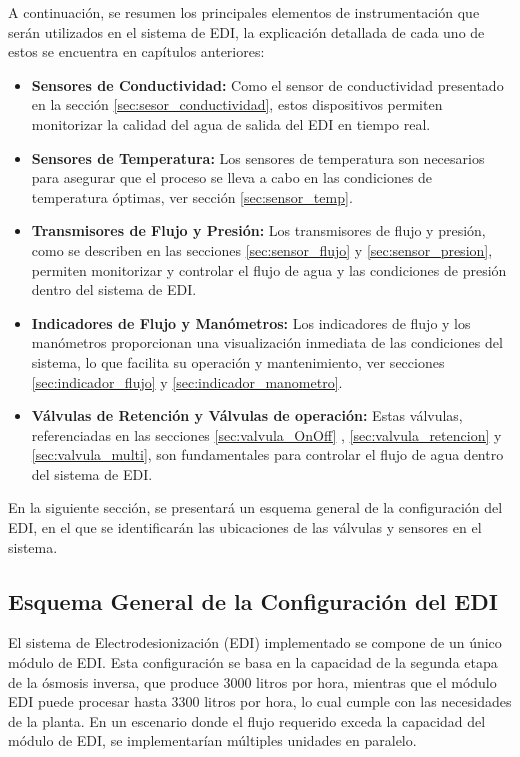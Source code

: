 A continuación, se resumen los principales elementos de instrumentación que serán utilizados en el sistema de EDI, la explicación detallada de cada uno de estos se encuentra en capítulos anteriores:
\begin{itemize}
    \item \textbf{Sensores de Conductividad:} Como el sensor de conductividad presentado en la sección \ref{sec:sesor_conductividad}, estos dispositivos permiten monitorizar la calidad del agua de salida del EDI en tiempo real.

    \item \textbf{Sensores de Temperatura:} Los sensores de temperatura son necesarios para asegurar que el proceso se lleva a cabo en las condiciones de temperatura óptimas, ver sección \ref{sec:sensor_temp}.

    \item \textbf{Transmisores de Flujo y Presión:} Los transmisores de flujo y presión, como se describen en las secciones \ref{sec:sensor_flujo} y \ref{sec:sensor_presion}, permiten monitorizar y controlar el flujo de agua y las condiciones de presión dentro del sistema de EDI.

    \item \textbf{Indicadores de Flujo y Manómetros:} Los indicadores de flujo y los manómetros proporcionan una visualización inmediata de las condiciones del sistema, lo que facilita su operación y mantenimiento, ver secciones \ref{sec:indicador_flujo} y \ref{sec:indicador_manometro}.

    \item \textbf{Válvulas de Retención y Válvulas de operación:} Estas válvulas, referenciadas en las secciones \ref{sec:valvula_OnOff} , \ref{sec:valvula_retencion} y \ref{sec:valvula_multi}, son fundamentales para controlar el flujo de agua dentro del sistema de EDI.
\end{itemize}
En la siguiente sección, se presentará un esquema general de la configuración del EDI, en el que se identificarán las ubicaciones de las válvulas y sensores en el sistema.

\subsection{Esquema General de la Configuración del EDI}

El sistema de Electrodesionización (EDI) implementado se compone de un único módulo de EDI.
Esta configuración se basa en la capacidad de la segunda etapa de la ósmosis inversa, que
produce 3000 litros por hora, mientras que el módulo EDI puede procesar hasta 3300 litros por hora,
lo cual cumple con las necesidades de la planta. En un escenario donde el flujo requerido exceda la
capacidad del módulo de EDI, se implementarían múltiples unidades en paralelo.

